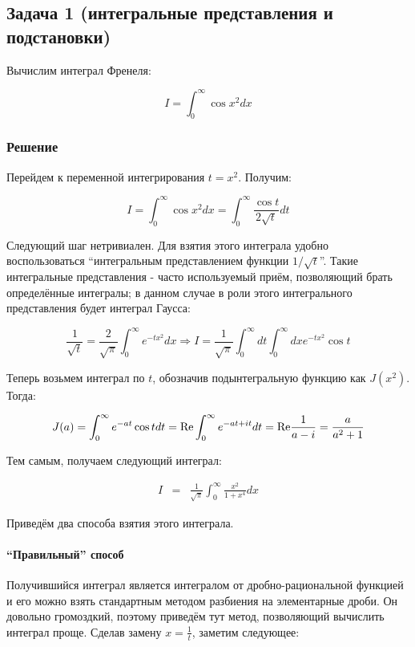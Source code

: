 \documentclass[a4paper,12pt]{article}
\begin{document}
\subsection*{Задача 1 (интегральные представления и подстановки)}

Вычислим интеграл Френеля:

\[
I=\int_{0}^{\infty}\cos x^{2}dx
\]



\subsubsection*{Решение}

Перейдем к переменной интегрирования $t=x^{2}$. Получим:

\[
I=\int_{0}^{\infty}\cos x^{2}dx=\int_{0}^{\infty}\frac{\cos t}{2\sqrt{t}}dt
\]

\noindent
Следующий шаг нетривиален. Для взятия этого интеграла удобно воспользоваться
``интегральным представлением функции $1/\sqrt{t}$''. Такие интегральные
представления - часто используемый приём, позволяющий брать определённые
интегралы; в данном случае в роли этого интегрального представления
будет интеграл Гаусса:

\[
\frac{1}{\sqrt{t}}=\frac{2}{\sqrt{\pi}}\int_{0}^{\infty}e^{-tx^{2}}dx\Rightarrow I=\frac{1}{\sqrt{\pi}}\int_{0}^{\infty}dt\int_{0}^{\infty}dxe^{-tx^{2}}\cos t
\]

\noindent
Теперь возьмем интеграл по $t$, обозначив подынтегральную функцию
как $J(x^{2})$. Тогда:

\[
J(a)=\int_{0}^{\infty}e^{-at}\cos tdt={\rm Re}\int_{0}^{\infty}e^{-at+it}dt={\rm Re}\frac{1}{a-i}=\frac{a}{a^{2}+1}
\]

\noindent
Тем самым, получаем следующий интеграл:

\begin{eqnarray*}
I & = & \frac{1}{\sqrt{\pi}}\int_{0}^{\infty}\frac{x^{2}}{1+x^{4}}dx
\end{eqnarray*}

\noindent
Приведём два способа взятия этого интеграла.


\paragraph{``Правильный'' способ}

Получившийся интеграл является интегралом от дробно-рациональной функцией
и его можно взять стандартным методом разбиения на элементарные дроби.
Он довольно громоздкий, поэтому приведём тут метод, позволяющий вычислить
интеграл проще. Сделав замену $x=\frac{1}{t}$, заметим следующее:
\end{document}
